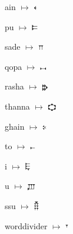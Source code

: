 {\noindent ain $\mapsto$ {\ugfont 𐎓}\par
\noindent pu $\mapsto$ {\ugfont 𐎔}\par
\noindent sade $\mapsto$ {\ugfont 𐎕}\par
\noindent qopa $\mapsto$ {\ugfont 𐎖}\par
\noindent rasha $\mapsto$ {\ugfont 𐎗}\par
\noindent thanna $\mapsto$ {\ugfont 𐎘}\par
\noindent ghain $\mapsto$ {\ugfont 𐎙}\par
\noindent to $\mapsto$ {\ugfont 𐎚}\par
\noindent i $\mapsto$ {\ugfont 𐎛}\par
\noindent u $\mapsto$ {\ugfont 𐎜}\par
\noindent ssu $\mapsto$ {\ugfont 𐎝}\par
\noindent worddivider $\mapsto$ {\ugfont 𐎟}\par
}


